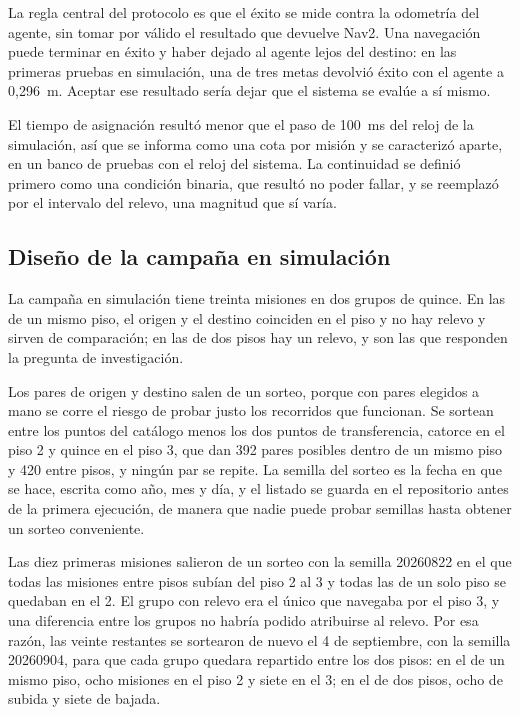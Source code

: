 La regla central del protocolo es que el éxito se mide contra la odometría del agente, sin tomar por válido el resultado que devuelve Nav2. Una navegación puede terminar en éxito y haber dejado al agente lejos del destino: en las
primeras pruebas en simulación, una de tres metas devolvió éxito con el agente a 0,296~m. Aceptar ese resultado sería dejar que el sistema se evalúe a sí mismo.

El tiempo de asignación resultó menor que el paso de 100~ms del reloj de la simulación, así que se informa como una cota por misión y se caracterizó aparte, en un banco de pruebas con el reloj del sistema. La continuidad se definió
primero como una condición binaria, que resultó no poder fallar, y se reemplazó por el intervalo del relevo, una magnitud que sí varía.

\subsection{Diseño de la campaña en simulación}

La campaña en simulación tiene treinta misiones en dos grupos de quince. En las de un mismo piso, el origen y el destino coinciden en el piso y no hay relevo y sirven de comparación; en las de dos pisos hay un
relevo, y son las que responden la pregunta de investigación.

Los pares de origen y destino salen de un sorteo, porque con pares elegidos a mano se corre el riesgo de probar justo los recorridos que funcionan. Se sortean entre los puntos del catálogo menos los dos puntos de transferencia, catorce
en el piso 2 y quince en el piso 3, que dan 392 pares posibles dentro de un mismo piso y 420 entre pisos, y ningún par se repite. La semilla del sorteo es la fecha en que se hace, escrita como año, mes y día, y el listado se guarda en
el repositorio antes de la primera ejecución, de manera que nadie puede probar semillas hasta obtener un sorteo conveniente.

Las diez primeras misiones salieron de un sorteo con la semilla 20260822 en el que todas las misiones entre pisos subían del piso 2 al 3 y todas las de un solo piso se quedaban en el 2. El grupo con relevo era el único que navegaba por
el piso 3, y una diferencia entre los grupos no habría podido atribuirse al relevo. Por esa razón, las veinte restantes se sortearon de nuevo el 4 de septiembre, con la semilla 20260904, para que cada grupo quedara repartido
entre los dos pisos: en el de un mismo piso, ocho misiones en el piso 2 y siete en el 3; en el de dos pisos, ocho de subida y siete de bajada.

